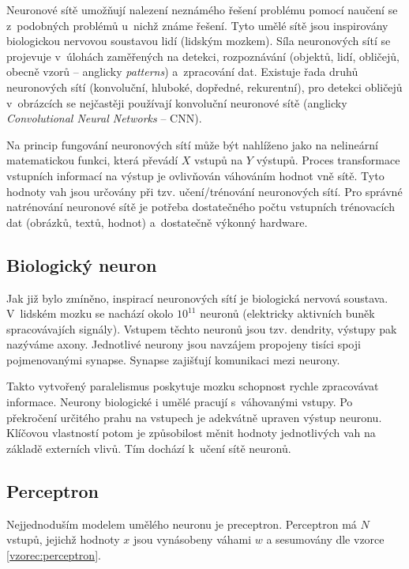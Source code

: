 Neuronové sítě \cite{deeplearningbook, ns1994} umožňují nalezení neznámého řešení problému pomocí naučení se z~podobných problémů u~nichž známe řešení. Tyto umělé sítě jsou inspirovány biologickou nervovou soustavou lidí (lidským mozkem). Síla neuronových sítí se projevuje v~úlohách zaměřených na detekci, rozpoznávání (objektů, lidí, obličejů, obecně vzorů -- anglicky \emph{patterns}) a~zpracování dat. Existuje řada druhů neuronových sítí (konvoluční, hluboké, dopředné, rekurentní), pro detekci obličejů v~obrázcích se nejčastěji používají konvoluční neuronové sítě (anglicky \emph{Convolutional Neural Networks} -- CNN). 

Na princip fungování neuronových sítí může být nahlíženo jako na nelineární matematickou funkci, která převádí $X$ vstupů na $Y$ výstupů. Proces transformace vstupních informací na výstup je ovlivňován váhováním hodnot vně sítě. Tyto hodnoty vah jsou určovány při tzv. učení/trénování neuronových sítí. Pro správné natrénování neuronové sítě je potřeba dostatečného počtu vstupních trénovacích dat (obrázků, textů, hodnot) a~dostatečně výkonný hardware. 

\subsection*{Biologický neuron}
Jak již bylo zmíněno, inspirací neuronových sítí je biologická nervová soustava. V~lidském mozku se nachází okolo $10^{11}$ neuronů (elektricky aktivních buněk spracovávajích signály). Vstupem těchto neuronů jsou tzv. dendrity, výstupy pak nazýváme axony. Jednotlivé neurony jsou navzájem propojeny tisíci spoji pojmenovanými synapse. Synapse zajišťují komunikaci mezi neurony.

Takto vytvořený paralelismus poskytuje mozku schopnost rychle zpracovávat informace. Neurony biologické i umělé pracují s~váhovanými vstupy. Po překročení určitého prahu na vstupech je adekvátně upraven výstup neuronu. Klíčovou vlastností potom je způsobilost měnit hodnoty jednotlivých vah na základě externích vlivů. Tím dochází k~učení sítě neuronů.

\subsection*{Perceptron}

Nejjednoduším modelem umělého neuronu je preceptron. Perceptron má $N$ vstupů, jejichž hodnoty $x$ jsou vynásobeny váhami $w$ a sesumovány dle vzorce \ref{vzorec:perceptron}.

